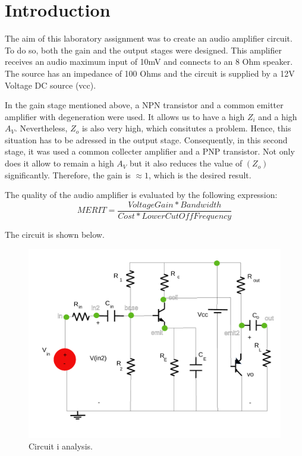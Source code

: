 \section{Introduction}
\label{introduction}


\par The aim of this laboratory assignment was to create an audio amplifier circuit. To do so, both the gain and the output stages were designed. This amplifier receives an audio maximum input of 10mV and connects to an 8 Ohm speaker. The source has an impedance of 100 Ohms and the circuit is supplied by a 12V Voltage DC source (vcc).
\par In the gain stage mentioned above, a NPN transistor and a common emitter amplifier with degeneration were used. It allows us to have a high $Z_{i}$ and a high $A_{V}$. Nevertheless, $Z_{o}$ is also very high, which consitutes a problem. Hence, this situation has to be adressed in the output stage. Consequently, in this second stage, it was used a common collecter amplifier and a PNP transistor. Not only does it allow to remain a high $A_{V}$ but it also reduces the value of $(Z_{o})$ significantly. Therefore, the gain is $\approx 1$, which is the desired result.

\par The quality of the audio amplifier is evaluated by the following expression:
\begin {equation}
	 MERIT = \frac{Voltage Gain*Bandwidth}{Cost*Lower Cut Off Frequency}   	
	\label{merit}
\end{equation}

The circuit is shown below.

\begin{figure}[ht] \centering
\includegraphics[width=0.8\linewidth]{lab4.pdf}
\caption{Circuit i analysis.}
\label{circuito todo}
\end{figure}
\par 


\newpage

